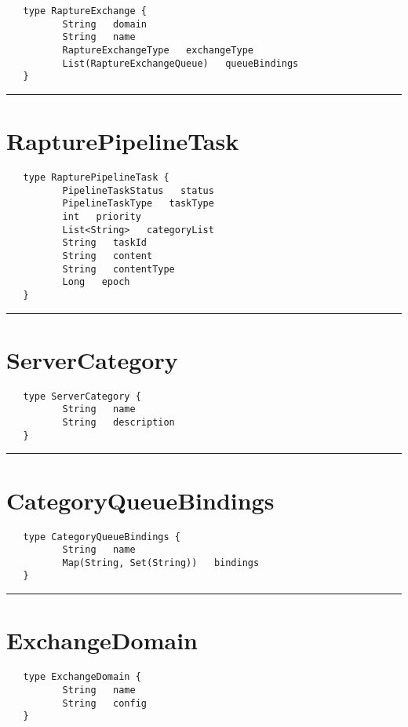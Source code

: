 \begin{verbatim}
   type RaptureExchange {
          String   domain
          String   name
          RaptureExchangeType   exchangeType
          List(RaptureExchangeQueue)   queueBindings
   }
\end{verbatim}

\rule{12cm}{2pt}
\section{RapturePipelineTask}
\label{type:RapturePipelineTask}

\begin{verbatim}
   type RapturePipelineTask {
          PipelineTaskStatus   status
          PipelineTaskType   taskType
          int   priority
          List<String>   categoryList
          String   taskId
          String   content
          String   contentType
          Long   epoch
   }
\end{verbatim}

\rule{12cm}{2pt}
\section{ServerCategory}
\label{type:ServerCategory}

\begin{verbatim}
   type ServerCategory {
          String   name
          String   description
   }
\end{verbatim}

\rule{12cm}{2pt}
\section{CategoryQueueBindings}
\label{type:CategoryQueueBindings}

\begin{verbatim}
   type CategoryQueueBindings {
          String   name
          Map(String, Set(String))   bindings
   }
\end{verbatim}

\rule{12cm}{2pt}
\section{ExchangeDomain}
\label{type:ExchangeDomain}

\begin{verbatim}
   type ExchangeDomain {
          String   name
          String   config
   }
\end{verbatim}


